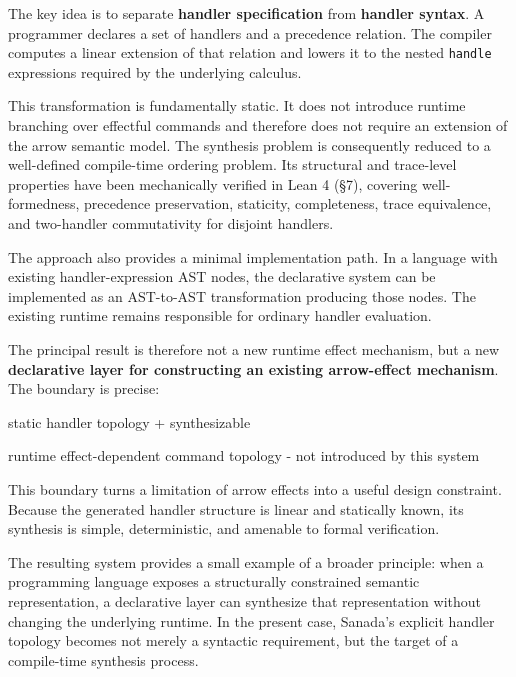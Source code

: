 \documentclass[
  11pt,
]{article}
\newenvironment{Shaded}{}{}
\newcommand{\NormalTok}[1]{#1}
\begin{document}
The key idea is to separate \textbf{handler specification} from
\textbf{handler syntax}. A programmer declares a set of handlers and a
precedence relation. The compiler computes a linear extension of that
relation and lowers it to the nested \texttt{handle} expressions
required by the underlying calculus.

This transformation is fundamentally static. It does not introduce
runtime branching over effectful commands and therefore does not require
an extension of the arrow semantic model. The synthesis problem is
consequently reduced to a well-defined compile-time ordering problem.
Its structural and trace-level properties have been mechanically
verified in Lean 4 (§7), covering well-formedness, precedence
preservation, staticity, completeness, trace equivalence, and
two-handler commutativity for disjoint handlers.

The approach also provides a minimal implementation path. In a language
with existing handler-expression AST nodes, the declarative system can
be implemented as an AST-to-AST transformation producing those nodes.
The existing runtime remains responsible for ordinary handler
evaluation.

The principal result is therefore not a new runtime effect mechanism,
but a new \textbf{declarative layer for constructing an existing
arrow-effect mechanism}. The boundary is precise:

\begin{Shaded}
\begin{Highlighting}[]
\NormalTok{static handler topology}
\NormalTok{        + synthesizable}

\NormalTok{runtime effect{-}dependent command topology}
\NormalTok{        {-} not introduced by this system}
\end{Highlighting}
\end{Shaded}

This boundary turns a limitation of arrow effects into a useful design
constraint. Because the generated handler structure is linear and
statically known, its synthesis is simple, deterministic, and amenable
to formal verification.

The resulting system provides a small example of a broader principle:
when a programming language exposes a structurally constrained semantic
representation, a declarative layer can synthesize that representation
without changing the underlying runtime. In the present case, Sanada's
explicit handler topology becomes not merely a syntactic requirement,
but the target of a compile-time synthesis process.
\end{document}
